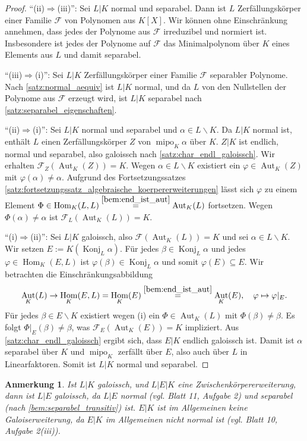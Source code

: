 \documentclass[a4paper, twoside, 11pt, ngerman]{report}
\newcommand{\calF}{\mathcal F}
\renewcommand{\setminus}{\smallsetminus}
\DeclareMathOperator{\Aut}{Aut}
\DeclareMathOperator{\Hom}{Hom}
\DeclareMathOperator{\Konj}{Konj}
\DeclareMathOperator{\mipo}{mipo}
\theoremstyle{definistyle}
\newtheorem{anm}[satz]{Anmerkung}
\theoremstyle{remark}
\begin{document}
\begin{proof}
"`(ii)$\Rightarrow$(iii)"': Sei $L|K$ normal und separabel. Dann ist $L$ Zerfällungskörper einer Familie $\calF$ von Polynomen aus $K[X]$. Wir können ohne Einschränkung annehmen, dass jedes der Polynome aus $\calF$ irreduzibel 
und normiert ist. Insbesondere ist jedes der Polynome auf $\calF$ das Minimalpolynom über $K$ eines Elements aus $L$
und damit separabel.

"`(iii)$\Rightarrow$(i)"': Sei $L|K$ Zerfällungskörper einer Familie $\calF$ separabler Polynome.
Nach \ref{satz:normal_aequiv} ist $L|K$ normal, und da $L$ von den Nullstellen der Polynome aus $\calF$ erzeugt wird, ist $L|K$ separabel nach \ref{satz:separabel_eigenschaften}.

"`(ii)$\Rightarrow$(i)"': Sei $L|K$ normal und separabel und $\alpha \in L \setminus K$.
Da $L|K$ normal ist, enthält $L$ einen Zerfällungskörper $Z$ von $\mipo_K\alpha$ über $K$.
$Z|K$ ist endlich, normal und separabel, also galoissch nach \ref{satz:char_endl_galoissch}.
Wir erhalten $\calF_Z(\Aut_K (Z))=K$. Wegen $\alpha\in L\setminus K$ existiert ein
$\varphi\in\Aut_K(Z)$ mit $\varphi(\alpha)\neq\alpha$. Aufgrund des Fortsetzungssatzes
\ref{satz:fortsetzungssatz_algebraische_koerpererweiterungen} lässt sich
$\varphi$ zu einem Element $\Phi\in\Hom_K(L,L)\overset{\ref{bem:end_ist_aut}}{=}\Aut_K(L)$
fortsetzen. Wegen $\Phi(\alpha)\neq\alpha$ ist $\calF_L(\Aut_K(L))=K$.

"`(i)$\Rightarrow$(ii)"': Sei $L|K$ galoissch, also $\mathcal{F}(\Aut_K(L)) = K$ und sei $\alpha \in L \setminus K$. Wir setzen $E := K(\Konj_L\alpha)$. 
Für jedes $\beta\in\Konj_L\alpha$ und jedes $\varphi\in\Hom_K(E,L)$ ist
$\varphi(\beta)\in\Konj_L\alpha$ und somit $\varphi(E)\subseteq E$.
Wir betrachten die Einschränkungsabbildung
\[
\Aut_K(L) \to \Hom_K(E,L) = \Hom_K(E)\overset{\ref{bem:end_ist_aut}}{=}\Aut_K(E), \quad \varphi \mapsto \varphi|_E.
\]
Für jedes $\beta \in E \setminus K$ existiert wegen (i) ein $\Phi \in \Aut_K(L)$ mit 
$\Phi(\beta) \neq \beta$. Es folgt $\Phi|_E(\beta) \neq \beta$, was $\mathcal{F}_E(\Aut_K(E)) = K$ impliziert. Aus \ref{satz:char_endl_galoissch}
ergibt sich, dass $E|K$ endlich galoissch ist. Damit ist $\alpha$ separabel über $K$ und $\mipo_K$ zerfällt über $E$, also auch über $L$ in Linearfaktoren. Somit ist $L|K$ normal und separabel.
\end{proof}

\begin{anm}\label{anm:galoissch_ueber_zk}
Ist $L|K$ galoissch, und $L|E|K$ eine Zwischenkörpererweiterung, dann ist $L|E$ galoissch, da $L|E$ normal (vgl. Blatt 11, Aufgabe 2) und separabel (nach \ref{bem:separabel_transitiv}) ist. $E|K$ ist im Allgemeinen keine Galoiserweiterung, da $E|K$ im Allgemeinen nicht normal ist (vgl. Blatt 10, Aufgabe 2(iii)).
\end{anm}
\end{document}
